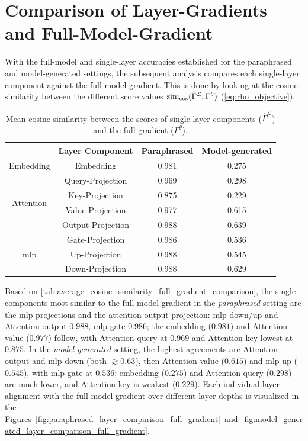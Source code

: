 \section{Comparison of Layer-Gradients and Full-Model-Gradient}\label{sec:layer_vs_full}
With the full-model and single-layer accuracies established for the paraphrased and model-generated settings, the subsequent analysis compares each single-layer component against the full-model gradient. This is done by looking at the cosine-similarity between the different score values $\operatorname{sim}_{\cos}(\hat{\Gamma}^{\mathcal{L}},\Gamma^\theta)$ (\autoref{eq:rho_objective}).
\begin{table}[H]
    \centering
    \begin{tabular}{|c|c|c|c|}
        \hline
        & \textbf{Layer Component} & \textbf{Paraphrased} & \textbf{Model-generated} \\
        \hline
        \multirow{1}{5em}{Embedding}
        & Embedding & 0.981 & 0.275 \\
        \hline
        \multirow{4}{5em}{Attention}
        & Query-Projection & 0.969 & 0.298 \\
        & Key-Projection & 0.875 & 0.229 \\
        & Value-Projection & 0.977 & 0.615 \\
        & Output-Projection & 0.988 & 0.639 \\
        \hline
        \multirow{3}{5em}{\acrshort{mlp}}
        & Gate-Projection & 0.986 & 0.536 \\
        & Up-Projection & 0.988 & 0.545 \\
        & Down-Projection & 0.988 & 0.629 \\
        \hline
    \end{tabular}
    \caption{Mean cosine similarity between the scores of single layer components ($\hat{\Gamma}^{\mathcal{L}}$) and the full gradient ($\Gamma^\theta$).}
    \label{tab:average_cosine_similarity_full_gradient_comparison}
\end{table}
\noindent Based on \autoref{tab:average_cosine_similarity_full_gradient_comparison}, the single components most similar to the full-model gradient in the \emph{paraphrased} setting are the \acrshort{mlp} projections and the attention output projection: \acrshort{mlp} down/up and Attention output $0.988$, \acrshort{mlp} gate $0.986$; the embedding ($0.981$) and Attention value ($0.977$) follow, with Attention query at $0.969$ and Attention key lowest at $0.875$. In the \emph{model-generated} setting, the highest agreements are Attention output and \acrshort{mlp} down (both $\gtrsim 0.63$), then Attention value ($0.615$) and \acrshort{mlp} up ($0.545$), with \acrshort{mlp} gate at $0.536$; embedding ($0.275$) and Attention query ($0.298$) are much lower, and Attention key is weakest ($0.229$). Each individual layer alignment with the full model gradient over different layer depths is visualized in the Figures~\ref{fig:paraphrased_layer_comparison_full_gradient}~and~\ref{fig:model_generated_layer_comparison_full_gradient}.

